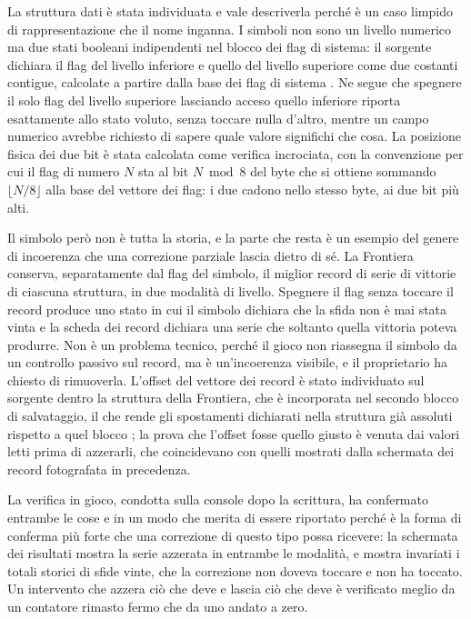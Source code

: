 La struttura dati è stata individuata e vale descriverla perché è un caso limpido di rappresentazione che il nome inganna. I simboli non sono un livello numerico ma due stati booleani indipendenti nel blocco dei flag di sistema: il sorgente dichiara il flag del livello inferiore e quello del livello superiore come due costanti contigue, calcolate a partire dalla base dei flag di sistema \cite{pokeemerald}. Ne segue che spegnere il solo flag del livello superiore lasciando acceso quello inferiore riporta esattamente allo stato voluto, senza toccare nulla d'altro, mentre un campo numerico avrebbe richiesto di sapere quale valore significhi che cosa. La posizione fisica dei due bit è stata calcolata come verifica incrociata, con la convenzione per cui il flag di numero $N$ sta al bit $N \bmod 8$ del byte che si ottiene sommando $\lfloor N/8 \rfloor$ alla base del vettore dei flag: i due cadono nello stesso byte, ai due bit più alti.

Il simbolo però non è tutta la storia, e la parte che resta è un esempio del genere di incoerenza che una correzione parziale lascia dietro di sé. La Frontiera conserva, separatamente dal flag del simbolo, il miglior record di serie di vittorie di ciascuna struttura, in due modalità di livello. Spegnere il flag senza toccare il record produce uno stato in cui il simbolo dichiara che la sfida non è mai stata vinta e la scheda dei record dichiara una serie che soltanto quella vittoria poteva produrre. Non è un problema tecnico, perché il gioco non riassegna il simbolo da un controllo passivo sul record, ma è un'incoerenza visibile, e il proprietario ha chiesto di rimuoverla. L'offset del vettore dei record è stato individuato sul sorgente dentro la struttura della Frontiera, che è incorporata nel secondo blocco di salvataggio, il che rende gli spostamenti dichiarati nella struttura già assoluti rispetto a quel blocco \cite{pokeemerald}; la prova che l'offset fosse quello giusto è venuta dai valori letti prima di azzerarli, che coincidevano con quelli mostrati dalla schermata dei record fotografata in precedenza.

La verifica in gioco, condotta sulla console dopo la scrittura, ha confermato entrambe le cose e in un modo che merita di essere riportato perché è la forma di conferma più forte che una correzione di questo tipo possa ricevere: la schermata dei risultati mostra la serie azzerata in entrambe le modalità, e mostra invariati i totali storici di sfide vinte, che la correzione non doveva toccare e non ha toccato. Un intervento che azzera ciò che deve e lascia ciò che deve è verificato meglio da un contatore rimasto fermo che da uno andato a zero.

